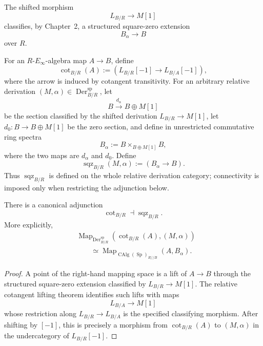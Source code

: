 The shifted morphism
\[
    L_{B/R}\longrightarrow M[1]
\]
classifies, by Chapter~2, a structured square-zero extension
\[
    B_\alpha\longrightarrow B
\]
over $R$.

\begin{definition}
\label{def:bnla-cot-sqz-functors}
For an $R$-$E_\infty$-algebra map $A\to B$, define
\[
    \operatorname{cot}_{B/R}(A)
    :=
    \left(
        L_{B/R}[-1]\longrightarrow L_{B/A}[-1]
    \right),
\]
where the arrow is induced by cotangent transitivity.  For an arbitrary
relative derivation $(M,\alpha)\in\operatorname{Der}^{\mathrm{sp}}_{B/R}$,
let
\[
    B\xrightarrow{d_\alpha}B\oplus M[1]
\]
be the section classified by the shifted derivation
$L_{B/R}\to M[1]$, let $d_0:B\to B\oplus M[1]$ be the zero section, and
define in unrestricted commutative ring spectra
\[
    B_\alpha
    :=
    B\times_{B\oplus M[1]}B,
\]
where the two maps are $d_\alpha$ and $d_0$.  Define
\[
    \operatorname{sqz}_{B/R}(M,\alpha)
    :=
    \left(B_\alpha\longrightarrow B\right).
\]
Thus $\operatorname{sqz}_{B/R}$ is defined on the whole relative derivation
category; connectivity is imposed only when restricting the adjunction below.
\end{definition}

\begin{proposition}
\label{prop:bnla-cot-sqz-adjunction}
There is a canonical adjunction
\[
    \operatorname{cot}_{B/R}
    \dashv
    \operatorname{sqz}_{B/R}.
\]
More explicitly,
\[
\begin{aligned}
&\operatorname{Map}_{\operatorname{Der}^{\mathrm{sp}}_{B/R}}
\left(
    \operatorname{cot}_{B/R}(A),(M,\alpha)
\right)
\\
&\qquad\simeq
\operatorname{Map}_{\operatorname{CAlg}(\operatorname{Sp})_{R//B}}
\left(A,B_\alpha\right).
\end{aligned}
\]
\end{proposition}

\begin{proof}
A point of the right-hand mapping space is a lift of $A\to B$ through the
structured square-zero extension classified by
$L_{B/R}\to M[1]$.  The relative cotangent lifting theorem identifies such
lifts with maps
\[
    L_{B/A}\longrightarrow M[1]
\]
whose restriction along $L_{B/R}\to L_{B/A}$ is the specified classifying
morphism.  After shifting by $[-1]$, this is precisely a morphism from
$\operatorname{cot}_{B/R}(A)$ to $(M,\alpha)$ in the undercategory of
$L_{B/R}[-1]$.
\end{proof}

